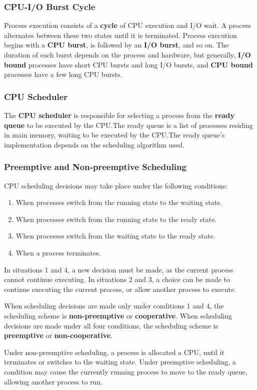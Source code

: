 \documentclass{article}
\begin{document}
\subsubsection{CPU-I/O Burst Cycle}
Process execution consists of a \textbf{cycle} of CPU execution and I/O
wait. A process alternates between these two states until it is
terminated. Process execution begins with a \textbf{CPU burst}, is
followed by an \textbf{I/O burst}, and so on. The duration of each
burst depends on the process and hardware, but generally, \textbf{I/O
bound} processes have short CPU bursts and long I/O bursts, and
\textbf{CPU bound} processes have a few long CPU bursts.
\subsubsection{CPU Scheduler}
The \textbf{CPU scheduler} is responsible for selecting a process from
the \textbf{ready queue} to be executed by the CPU.\@ The ready queue
is a list of processes residing in main memory, waiting to be executed
by the CPU.\@ The ready queue's implementation depends on the
scheduling algorithm used.
\subsubsection{Preemptive and Non-preemptive Scheduling}
CPU scheduling decisions may take place under the following conditions:
\begin{enumerate}
    \item When processes switch from the running state to the waiting
          state.
    \item When processes switch from the running state to the ready
          state.
    \item When processes switch from the waiting state to the ready
          state.
    \item When a process terminates.
\end{enumerate}
In situations 1 and 4, a new decision must be made, as the current process
cannot continue executing. In situations 2 and 3, a choice can be made
to continue executing the current process, or allow another process to
execute.

When scheduling decisions are made only under conditions 1 and 4, the
scheduling scheme is \textbf{non-preemptive} or \textbf{cooperative}.
When scheduling decisions are made under all four conditions, the
scheduling scheme is \textbf{preemptive} or \textbf{non-cooperative}.

Under non-preemptive scheduling, a process is allocated a CPU, until it
terminates or switches to the waiting state. Under preemptive
scheduling, a condition may cause the currently running process to move
to the ready queue, allowing another process to run.
\end{document}
